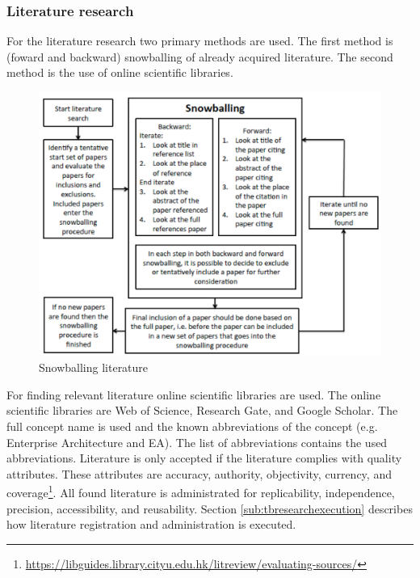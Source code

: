 \subsubsection{Literature research}
For the literature research two primary methods are used. The first method is (foward and backward) snowballing of already acquired literature. The second method is the use of online scientific libraries.

\begin{figure}[H]
	\centering
	\includegraphics[width=0.6\linewidth]{images/snowball}
	\caption[Snowballing literature]{Snowballing literature \parencite{Botjes2021a}}
	\label{fig:snowball}
\end{figure}

For finding relevant literature online scientific libraries are used. The online scientific libraries are Web of Science, Research Gate, and Google Scholar. The full concept name is used and the known abbreviations of the concept (e.g. Enterprise Architecture and EA). The list of abbreviations contains the used abbreviations. Literature is only accepted if the literature complies with quality attributes. These attributes are accuracy, authority, objectivity, currency, and coverage\footnote{\url{https://libguides.library.cityu.edu.hk/litreview/evaluating-sources/}}. All found literature is administrated for replicability, independence, precision, accessibility, and reusability. Section \ref{sub:tbresearchexecution} describes how literature registration and administration is executed.

